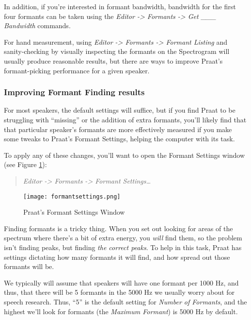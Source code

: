 \documentclass[11pt]{article}
\begin{document}
In addition, if you're interested in formant bandwidth, bandwidth for
the first four formants can be taken using the \emph{Editor
-\textgreater{} Formants -\textgreater{} Get \_\_\_ Bandwidth} commands.

For hand measurement, using \emph{Editor -\textgreater{} Formants
-\textgreater{} Formant Listing} and sanity-checking by visually
inspecting the formants on the Spectrogram will usually produce
reasonable results, but there are ways to improve Praat's
formant-picking performance for a given speaker.

\hypertarget{improving-formant-finding-results}{%
\subsubsection{Improving Formant Finding
results}\label{improving-formant-finding-results}}

For most speakers, the default settings will suffice, but if you find
Praat to be struggling with ``missing'' or the addition of extra
formants, you'll likely find that that particular speaker's formants are
more effectively measured if you make some tweaks to Praat's Formant
Settings, helping the computer with its task.

To apply any of these changes, you'll want to open the Formant Settings
window (see Figure \ref{formantsettings}):

\begin{quote}
\emph{Editor -\textgreater{} Formants -\textgreater{} Formant
Settings\ldots{}}
\end{quote}

\begin{figure}
  \centerline{
    \mbox{\texttt{[image: formantsettings.png]}}
  }
  \caption{Praat's Formant Settings Window \label{formantsettings}}

  \end{figure}

Finding formants is a tricky thing. When you set out looking for areas
of the spectrum where there's a bit of extra energy, you \emph{will}
find them, so the problem isn't finding peaks, but finding \emph{the
correct peaks}. To help in this task, Praat has settings dictating how
many formants it will find, and how spread out those formants will be.

We typically will assume that speakers will have one formant per 1000
Hz, and thus, that there will be 5 formants in the 5000 Hz we usually
worry about for speech research. Thus, ``5'' is the default setting for
\emph{Number of Formants}, and the highest we'll look for formants (the
\emph{Maximum Formant}) is 5000 Hz by default.
\end{document}

